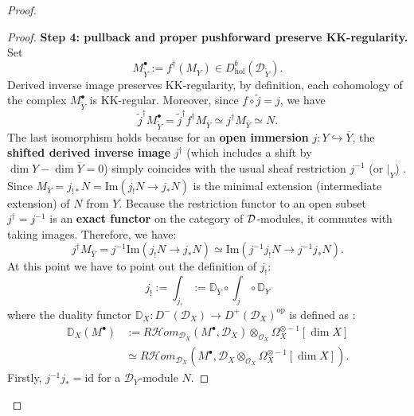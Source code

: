 \begin{remark}
\begin{proof}
\begin{enumerate}
\begin{proof}
                      \textbf{Step 4: pullback and proper pushforward preserve KK-regularity.}
                      Set
                      \[
                          M^\bullet_{\widetilde Y} := f^\dagger(M_{\overline Y}) \in D^b_{\mathrm{hol}}(\mathcal D_{\widetilde Y}).
                      \]
                      Derived inverse image preserves KK-regularity, by definition, each cohomology of the complex $M^\bullet_{\widetilde Y}$ is KK-regular.
                      Moreover, since $f\circ \widetilde j=j$, we have
                      \[
                          \widetilde j^\dagger M^\bullet_{\widetilde Y} = \widetilde j^\dagger f^\dagger M_{\overline Y} \simeq j^\dagger M_{\overline Y} \simeq N.
                      \]
                      The last isomorphism holds because for an \textbf{open immersion} $j: Y \hookrightarrow \overline Y$,
                      the \textbf{shifted derived inverse image} $j^\dagger$ (which includes a shift by $\dim Y - \dim \overline Y = 0$)
                      simply coincides with the usual sheaf restriction $j^{-1}$ (or $|_Y$) \cite[Example~1.5.12]{hotta2008d}.
                      Since $M_{\overline Y} = j_{!*}N = \mathrm{Im}(j_!N \to j_*N)$ is the minimal extension (intermediate extension) of $N$ from $Y$.
                      Because the restriction functor to an open subset $j^\dagger = j^{-1}$ is an \textbf{exact functor} \cite[\href{https://stacks.math.columbia.edu/tag/01AJ}{Tag 01AJ}]{stacks-project} on the category of $\mathcal{D}$-modules, it commutes with taking images.
                      Therefore, we have:
                      \[
                          j^\dagger M_{\overline Y} = j^{-1} \mathrm{Im}(j_!N \to j_*N) \simeq \mathrm{Im}(j^{-1}j_!N \to j^{-1}j_*N).
                      \]
                      At this point we have to point out the definition of $j_!$:
                      \[
                          j_! := \int_{j_!} := \mathbb{D}_{\overline Y}\circ \int_{j} \circ \mathbb{D}_{Y}
                      \]
                      where the duality functor $\mathbb{D}_X : D^-(\mathcal D_X) \to D^+(\mathcal D_X)^{\mathrm{op}}$ is defined as \cite[Def.~2.6.1]{hotta2008d}:
                      \begin{align*}
                          \mathbb{D}_X(M^\bullet) & := R\mathcal{H}om_{\mathcal D_X}(M^\bullet, \mathcal D_X) \otimes_{\mathcal O_X} \Omega_X^{\otimes -1}[\dim X]      \\
                                                  & \simeq R\mathcal{H}om_{\mathcal D_X}(M^\bullet, \mathcal D_X \otimes_{\mathcal O_X} \Omega_X^{\otimes -1}[\dim X]).
                      \end{align*}
                      Firstly, $j^{-1}j_* = \mathrm{id}$ for a $\mathcal{D}_Y$-module $N$.


\end{proof}
\end{enumerate}
\end{proof}
\end{remark}
